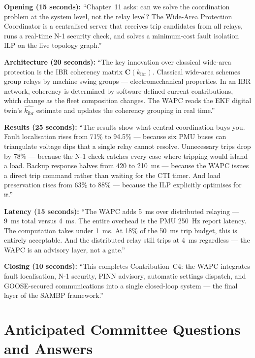 \documentclass[12pt,a4paper]{article}
\newcommand{\kibr}{k_\mathrm{ibr}}
\begin{document}
\begin{speakbox}
\textbf{Opening (15 seconds):}
``Chapter~11 asks: can we solve the coordination problem at the system level, not the relay level? The Wide-Area Protection Coordinator is a centralised server that receives trip candidates from all relays, runs a real-time N-1 security check, and solves a minimum-cost fault isolation ILP on the live topology graph.''

\medskip
\textbf{Architecture (20 seconds):}
``The key innovation over classical wide-area protection is the IBR coherency matrix $\mathbf{C}(\kibr)$. Classical wide-area schemes group relays by machine swing groups — electromechanical properties. In an IBR network, coherency is determined by software-defined current contributions, which change as the fleet composition changes. The WAPC reads the EKF digital twin's $\hat{\kibr}$ estimate and updates the coherency grouping in real time.''

\medskip
\textbf{Results (25 seconds):}
``The results show what central coordination buys you. Fault localisation rises from 71\% to 94.5\% — because six PMU buses can triangulate voltage dips that a single relay cannot resolve. Unnecessary trips drop by 78\% — because the N-1 check catches every case where tripping would island a load. Backup response halves from 420 to 210~ms — because the WAPC issues a direct trip command rather than waiting for the CTI timer. And load preservation rises from 63\% to 88\% — because the ILP explicitly optimises for it.''

\medskip
\textbf{Latency (15 seconds):}
``The WAPC adds 5~ms over distributed relaying — 9~ms total versus 4~ms. The entire overhead is the PMU 250~Hz report latency. The computation takes under 1~ms. At 18\% of the 50~ms trip budget, this is entirely acceptable. And the distributed relay still trips at 4~ms regardless — the WAPC is an advisory layer, not a gate.''

\medskip
\textbf{Closing (10 seconds):}
``This completes Contribution~C4: the WAPC integrates fault localisation, N-1 security, PINN advisory, automatic settings dispatch, and GOOSE-secured communications into a single closed-loop system — the final layer of the SAMBP framework.''
\end{speakbox}

\section{Anticipated Committee Questions and Answers}
\end{document}
